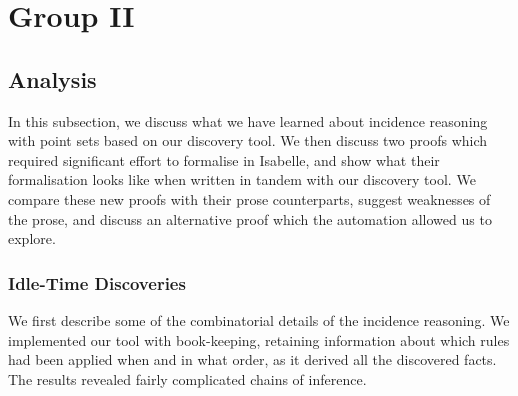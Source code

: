 \chapter{Group II}\label{chapter:Group2}
\section{Analysis}
In this subsection, we discuss what we have learned about incidence reasoning with point sets based on our discovery tool. We then discuss two proofs which required significant effort to formalise in Isabelle, and show what their formalisation looks like when written in tandem with our discovery tool. We compare these new proofs with their prose counterparts, suggest weaknesses of the prose, and discuss an alternative proof which the automation allowed us to explore.

\subsection{Idle-Time Discoveries}\label{sec:IdleTimeDiscoveries}
We first describe some of the combinatorial details of the incidence reasoning. We implemented our tool with book-keeping, retaining information about which rules had been applied when and in what order, as it derived all the discovered facts. The results revealed fairly complicated chains of inference. 

